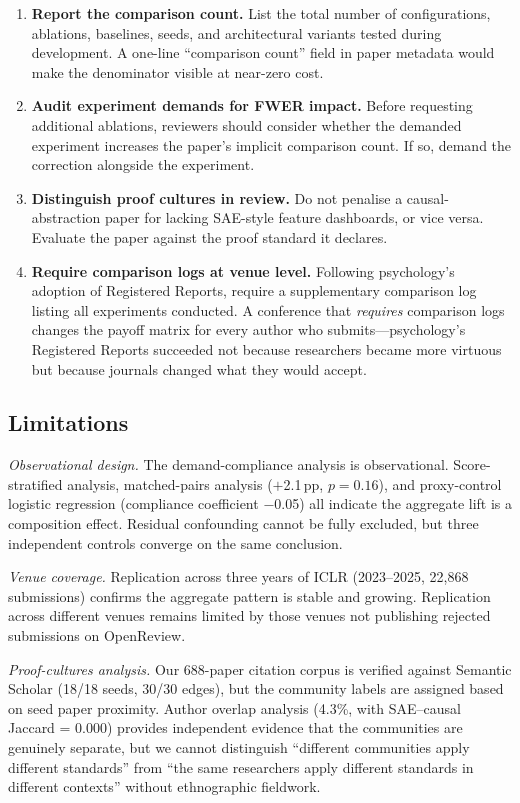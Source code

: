 \documentclass{article}
\begin{document}
\begin{enumerate}[leftmargin=*]
\item \textbf{Report the comparison count.} List the total number of configurations, ablations, baselines, seeds, and architectural variants tested during development. A one-line ``comparison count'' field in paper metadata would make the denominator visible at near-zero cost.
\item \textbf{Audit experiment demands for FWER impact.} Before requesting additional ablations, reviewers should consider whether the demanded experiment increases the paper's implicit comparison count. If so, demand the correction alongside the experiment.
\item \textbf{Distinguish proof cultures in review.} Do not penalise a causal-abstraction paper for lacking SAE-style feature dashboards, or vice versa. Evaluate the paper against the proof standard it declares.
\item \textbf{Require comparison logs at venue level.} Following psychology's adoption of Registered Reports, require a supplementary comparison log listing all experiments conducted. A conference that \textit{requires} comparison logs changes the payoff matrix for every author who submits---psychology's Registered Reports succeeded not because researchers became more virtuous but because journals changed what they would accept.
\end{enumerate}

\subsection{Limitations}
\label{sec:limitations}

\textit{Observational design.} The demand-compliance analysis is observational. Score-stratified analysis, matched-pairs analysis ($+$2.1\,pp, $p = 0.16$), and proxy-control logistic regression (compliance coefficient $-$0.05) all indicate the aggregate lift is a composition effect. Residual confounding cannot be fully excluded, but three independent controls converge on the same conclusion.

\textit{Venue coverage.} Replication across three years of ICLR (2023--2025, 22,868 submissions) confirms the aggregate pattern is stable and growing. Replication across different venues remains limited by those venues not publishing rejected submissions on OpenReview.

\textit{Proof-cultures analysis.} Our 688-paper citation corpus is verified against Semantic Scholar (18/18 seeds, 30/30 edges), but the community labels are assigned based on seed paper proximity. Author overlap analysis (4.3\%, with SAE--causal Jaccard = 0.000) provides independent evidence that the communities are genuinely separate, but we cannot distinguish ``different communities apply different standards'' from ``the same researchers apply different standards in different contexts'' without ethnographic fieldwork.
\end{document}
